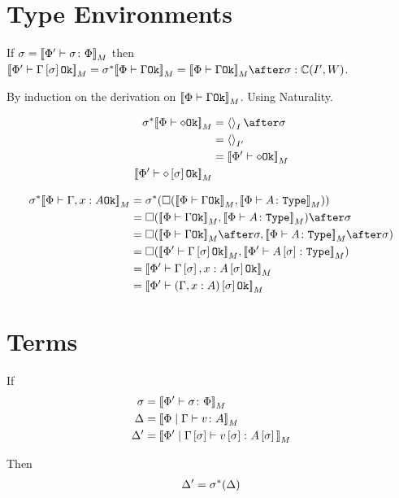 \documentclass{report}
\begin{document}
\section{Type Environments}
If $\sigma = {\bf [\![}\Phi' \vdash \sigma \colon \Phi{\bf ]\!]}_M$ then $\deno{\wellformedok{\P'}{\G\ssi}} = \si\star\deno{\wellformedok{\P}{\G}} = \deno{\wellformedok{\P}{\G}}\after\si: \cipw$.

\proof
By induction on the derivation on ${\bf [\![}\Phi\vdash \Gamma \texttt{Ok}{\bf ]\!]}_M$. Using Naturality.

\begin{align}
    \si\star\deno{\wellformedok{\P}{\nil}} &= \term{I}\after\si\\
    &= \term{I'}\\
    &= \deno{\wellformedok{\P'}{\nil}}\\
    \deno{\wellformedok{\P'}{\nil\ssi}}\\
\end{align}

\begin{align}
   \si\star\deno{\wellformedok{\P}{\gax}} &= \si\star(\square(\deno{\wellformedok{\P}{\G}},\deno{\typerelation{\P}{A}{\type}})) \\
    & = \square(\deno{\wellformedok{\P}{\G}},\deno{\typerelation{\P}{A}{\type}})\after\si\\
   & = \square(\deno{\wellformedok{\P}{\G}}\after\si, \deno{\typerelation{\P}{A}{\type}}\after\si)\\
    & = \square(\deno{\wellformedok{\P'}{\G\ssi}},\deno{\typerelation{\P'}{A\ssi}{\type}})\\
    & = \deno{\wellformedok{\P'}{\G\ssi, x: A\ssi}}\\
    & = \deno{\wellformedok{\P'}{(\gax)\ssi}}\\
\end{align}

\section{Terms}
If 
\begin{align}
    \sigma &= {\bf [\![}\Phi' \vdash \sigma \colon \Phi{\bf ]\!]}_M\\
    \Delta &= {\bf [\![}\Phi\mid\Gamma \vdash v \colon A{\bf ]\!]}_M\\
    \Delta' &= {\bf [\![}\Phi'\mid\Gamma\left[\sigma\right] \vdash v\left[\sigma\right] \colon A\left[\sigma\right]{\bf ]\!]}_M\\
\end{align}

Then \begin{eqnarray}
    \Delta' = \sigma^*(\Delta)
\end{eqnarray}
\end{document}
